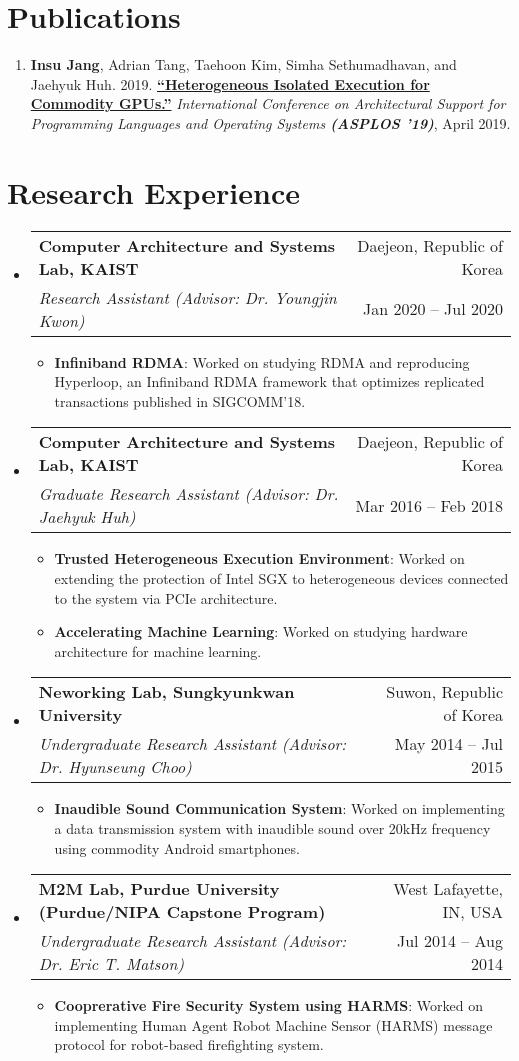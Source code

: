 \documentclass[letterpaper,oneside,11pt]{article}
\makeatletter
\newcommand{\resumeItem}[2]{
  \item\small{
    \textbf{#1}{: #2 \vspace{-2pt}}
  }
}
\newcommand{\resumeSubheading}[4]{
  \vspace{-1pt}\item
    \begin{tabular*}{0.97\textwidth}[t]{l@{\extracolsep{\fill}}r}
      \textbf{#1} & #2 \\
      \textit{\small#3} & \small #4 \\
    \end{tabular*}\vspace{-6pt}
}
\newcommand{\resumeSubHeadingListStart}{\begin{itemize}[leftmargin=*]}
\newcommand{\resumeSubHeadingListEnd}{\end{itemize}}
\newcommand{\resumeItemListStart}{\begin{itemize}}
\newcommand{\resumeItemListEnd}{\end{itemize}\vspace{-5pt}}
\makeatother
\begin{document}
\section{Publications}
\begin{enumerate}[leftmargin=*]
  \item \small \textbf{Insu Jang}, Adrian Tang, Taehoon Kim, Simha Sethumadhavan, and Jaehyuk Huh. 2019. \textbf{\href{https://dl.acm.org/doi/10.1145/3297858.3304021}{``Heterogeneous Isolated Execution for Commodity GPUs.''}} \textit{International Conference on Architectural Support for Programming Languages and Operating Systems \textbf{(ASPLOS ’19)}}, April 2019.
\end{enumerate}

\section{Research Experience}
  \resumeSubHeadingListStart
    \resumeSubheading
      {Computer Architecture and Systems Lab, KAIST}{Daejeon, Republic of Korea}
      {Research Assistant (Advisor: Dr. Youngjin Kwon)}{Jan 2020 -- Jul 2020}
      \resumeItemListStart
        \resumeItem{Infiniband RDMA}
          {Worked on studying RDMA and reproducing Hyperloop, an Infiniband RDMA framework that optimizes replicated transactions published in SIGCOMM'18.}
      \resumeItemListEnd
    \resumeSubheading
      {Computer Architecture and Systems Lab, KAIST}{Daejeon, Republic of Korea}
      {Graduate Research Assistant (Advisor: Dr. Jaehyuk Huh)}{Mar 2016 -- Feb 2018}
      \resumeItemListStart
        \resumeItem{Trusted Heterogeneous Execution Environment}
          {Worked on extending the protection of Intel SGX to heterogeneous devices connected to the system via PCIe architecture.}
        \resumeItem{Accelerating Machine Learning}
          {Worked on studying hardware architecture for machine learning.}
      \resumeItemListEnd
    \resumeSubheading{Neworking Lab, Sungkyunkwan University}{Suwon, Republic of Korea}
      {Undergraduate Research Assistant (Advisor: Dr. Hyunseung Choo)}{May 2014 -- Jul 2015}
      \resumeItemListStart
        \resumeItem{Inaudible Sound Communication System}
          {Worked on implementing a data transmission system with inaudible sound over 20kHz frequency using commodity Android smartphones.}
      \resumeItemListEnd
    \resumeSubheading{M2M Lab, Purdue University \footnotesize{(Purdue/NIPA Capstone Program)}}{West Lafayette, IN, USA}
      {Undergraduate Research Assistant (Advisor: Dr. Eric T. Matson)}{Jul 2014 -- Aug 2014}
      \resumeItemListStart
        \resumeItem{Cooprerative Fire Security System using HARMS}
          {Worked on implementing Human Agent Robot Machine Sensor (HARMS) message protocol for robot-based firefighting system.}
      \resumeItemListEnd
  \resumeSubHeadingListEnd
\end{document}
